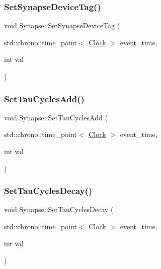 \mbox{\label{classSynapse_a702c08b1ee4389382a5890d8c19aee9c}} 
\subsubsection{\texorpdfstring{Set\+Synapse\+Device\+Tag()}{SetSynapseDeviceTag()}}
{\footnotesize\ttfamily void Synapse\+::\+Set\+Synapse\+Device\+Tag (\begin{DoxyParamCaption}\item[{std\+::chrono\+::time\+\_\+point$<$ \mbox{\hyperlink{universe_8h_a0ef8d951d1ca5ab3cfaf7ab4c7a6fd80}{Clock}} $>$}]{event\+\_\+time,  }\item[{int}]{val }\end{DoxyParamCaption})\hspace{0.3cm}{\ttfamily [inline]}}

\mbox{\label{classSynapse_afbd7a2e7e6353b3e743ec100fe615e84}} 
\subsubsection{\texorpdfstring{Set\+Tau\+Cycles\+Add()}{SetTauCyclesAdd()}}
{\footnotesize\ttfamily void Synapse\+::\+Set\+Tau\+Cycles\+Add (\begin{DoxyParamCaption}\item[{std\+::chrono\+::time\+\_\+point$<$ \mbox{\hyperlink{universe_8h_a0ef8d951d1ca5ab3cfaf7ab4c7a6fd80}{Clock}} $>$}]{event\+\_\+time,  }\item[{int}]{val }\end{DoxyParamCaption})\hspace{0.3cm}{\ttfamily [inline]}}

\mbox{\label{classSynapse_a5bbee6bb7dc49c90b7c3413d02e06cc8}} 
\subsubsection{\texorpdfstring{Set\+Tau\+Cycles\+Decay()}{SetTauCyclesDecay()}}
{\footnotesize\ttfamily void Synapse\+::\+Set\+Tau\+Cycles\+Decay (\begin{DoxyParamCaption}\item[{std\+::chrono\+::time\+\_\+point$<$ \mbox{\hyperlink{universe_8h_a0ef8d951d1ca5ab3cfaf7ab4c7a6fd80}{Clock}} $>$}]{event\+\_\+time,  }\item[{int}]{val }\end{DoxyParamCaption})\hspace{0.3cm}{\ttfamily [inline]}}

